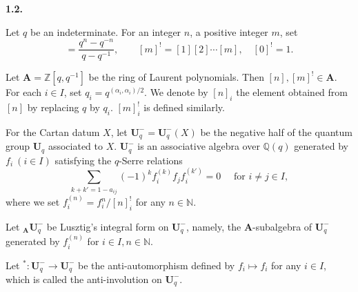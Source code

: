 \documentclass[12pt]{amsart}
\renewcommand\a{\alpha}
\renewcommand{\1}{\mathbb 1}
\newcommand{\QQ}{\mathbb Q}
\newcommand{\ZZ}{\mathbb Z}
\newcommand{\NN}{\mathbb N}
\newcommand\BA{\mathbf A}
\newcommand\BU{\mathbf U}
\newcommand\iv{^{-1}}
\numberwithin{equation}{section}
\def \para#1{\par\medskip\textbf{#1}
              \addtocounter{thm}{1}}
\begin{document}
\para{1.2.}
Let $q$ be an indeterminate. For an integer $n$, a positive integer $m$, set
\begin{equation*}
[n] = \frac{q^n- q^{-n}}{q - q\iv}, \qquad [m]^! = [1][2]\cdots [m], \quad [0]^! = 1.
\end{equation*}

Let $\BA = \ZZ[q,q\iv]$ be the ring of Laurent polynomials.  Then $[n], [m]^! \in \BA$. 
For each $i \in I$, set $q_i = q^{(\a_i,\a_i)/2}$.  We denote by $[n]_i$ 
the element obtained from $[n]$ by replacing $q$ by $q_i$.  $[m]^!_i$ is defined similarly.
\par
For the Cartan datum $X$, let $\BU_q^- = \BU_q^-(X)$ be the negative half of
the quantum group $\BU_q$ associated to $X$.  $\BU_q^-$ is an associative algebra over
$\QQ(q)$ generated by $f_i \ (i \in I)$ satisfying the $q$-Serre relations
\begin{equation*}
\sum_{k + k' = 1-a_{ij}}(-1)^kf_i^{(k)}f_jf_i^{(k')} = 0 \quad\text{ for } i \ne j \in I,
\end{equation*}
where we set $f_i^{(n)} = f_i^n/[n]_i^!$ for any $n \in \NN$. 
\par
Let ${}_{\BA}\BU_q^-$ be Lusztig's integral form on $\BU_q^-$,
namely, the $\BA$-subalgebra of $\BU_q^-$ generated by $f_i^{(n)}$ for $i \in I, n \in \NN$.
\par
Let ${}^* : \BU_q^- \to \BU_q^-$ be the anti-automorphism defined by
$f_i \mapsto f_i$ for any $i \in I$, which is called the anti-involution on $\BU_q^-$.  
\end{document}
